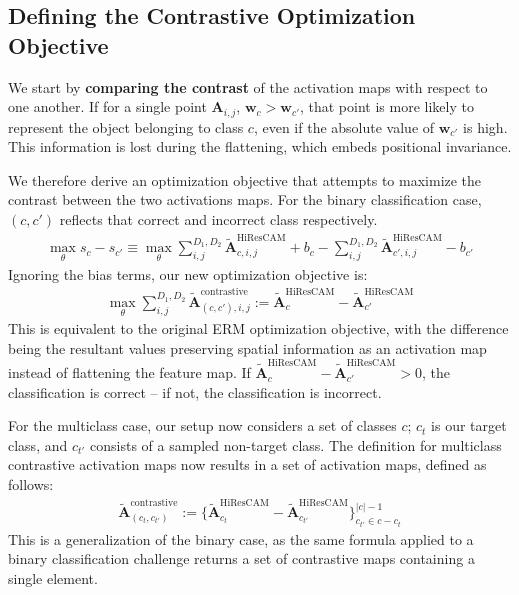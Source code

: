 \documentclass{article}
\begin{document}
\subsection{Defining the Contrastive Optimization Objective}

We start by \textbf{comparing the contrast} of the activation maps with respect to one another. If for a single point $\bm{A}_{i,j}$, $\bm{w}_c > \bm{w}_{c'}$, that point is more likely to represent the object belonging to class $c$, even if the absolute value of $\bm{w}_{c'}$ is high. This information is lost during the flattening, which embeds positional invariance.

We therefore derive an optimization objective that attempts to maximize the contrast between the two activations maps. For the binary classification case, $(c, c')$ reflects that correct and incorrect class respectively.
\begin{gather}
	\max_{\theta} s_c - s_{c'} \equiv \max_{\theta} \sum^{D_1,D_2}_{i,j} \tilde{\mathcal{\bm{A}}}_{c,i,j}^{\text{HiResCAM}} + b_c - \sum^{D_1,D_2}_{i,j} \tilde{\mathcal{\bm{A}}}_{c',i,j}^{\text{HiResCAM}} - b_{c'}
\end{gather}
Ignoring the bias terms, our new optimization objective is:
\begin{gather}
	\max_{\theta} \sum^{D_1,D_2}_{i,j} \tilde{\mathcal{\bm{A}}}^{\text{contrastive}}_{(c, c'), i, j} := \tilde{\mathcal{\bm{A}}}_{c}^{\text{HiResCAM}} - \tilde{\mathcal{\bm{A}}}_{c'}^{\text{HiResCAM}}
\end{gather}
This is equivalent to the original ERM optimization objective, with the difference being the resultant values preserving spatial information as an activation map instead of flattening the feature map. If $\tilde{\mathcal{\bm{A}}}_{c}^{\text{HiResCAM}} - \tilde{\mathcal{\bm{A}}}_{c'}^{\text{HiResCAM}} > 0$, the classification is correct -- if not, the classification is incorrect. 

For the multiclass case, our setup now considers a set of classes $c$; $c_t$ is our target class, and $c_{t'}$ consists of a sampled non-target class. The definition for multiclass contrastive activation maps now results in a set of activation maps, defined as follows:
\begin{gather}
	\tilde{\mathcal{\bm{A}}}^{\text{contrastive}}_{(c_t, c_{t'})} := \{\tilde{\mathcal{\bm{A}}}_{c_t}^{\text{HiResCAM}} - \tilde{\mathcal{\bm{A}}}_{c_{t'}}^{\text{HiResCAM}}\}^{|c|-1}_{c_{t'} \in c - c_t}
\end{gather}
This is a generalization of the binary case, as the same formula applied to a binary classification challenge returns a set of contrastive maps containing a single element.
\end{document}
